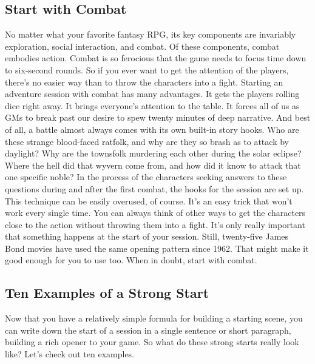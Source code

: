 \documentclass[10pt,a4paper,twoside,bg=print,twocolumn,openany,nodeprecatedcode]{dndbook}
\begin{document}
\subsection{Start with Combat}
No matter what your favorite fantasy RPG, its key components are invariably exploration, social interaction, and combat. Of these components, combat embodies action. Combat is so ferocious that the game needs to focus time down to six-second rounds. So if you ever want to get the attention of the players, there's no easier way than to throw the characters into a fight.
Starting an adventure session with combat has many advantages. It gets the players rolling dice right away. It brings everyone's attention to the table. It forces all of us as GMs to break past our desire to spew twenty minutes of deep narrative. And best of all, a battle almost always comes with its own built-in story hooks.
Who are these strange blood-faced ratfolk, and why are they so brash as to attack by daylight? Why are the townsfolk murdering each other during the solar eclipse? Where the hell did that wyvern come from, and how did it know to attack that one specific noble? In the process of the characters seeking answers to these questions during and after the first combat, the hooks for the session are set up.
This technique can be easily overused, of course. It's an easy trick that won't work every single time. You can always think of other ways to get the characters close to the action without throwing them into a fight. It's only really important that something happens at the start of your session.
Still, twenty-five James Bond movies have used the same opening pattern since 1962. That might make it good enough for you to use too.
When in doubt, start with combat.
\subsection{Ten Examples of a Strong Start}
Now that you have a relatively simple formula for building a starting scene, you can write down the start of a session in a single sentence or short paragraph, building a rich opener to your game. So what do these strong starts really look like? Let's check out ten examples.
\end{document}
